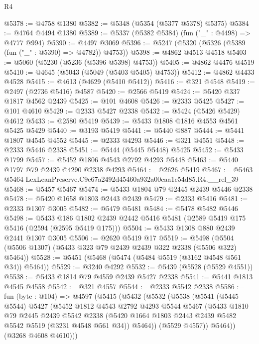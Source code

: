 \begin{lexlean}{R4}
\begin{coremodule}
@5378 := @4758 @1380
@5382 := @5348 (@5354 (@5377 @5378) @5375)
@5384 := @4764 @4494 @1380
@5389 := @5337 (@5382 @5384) (fun ("_" : @4498) => @4777 @994)
@5390 := @4497 @3069
@5396 := @5247 (@5320 (@5326 (@5389 (fun ("_" : @5390) => @4782)) @4753))
@5398 := @4862 @4513 @4518
@5403 := @5060 (@5230 (@5236 (@5396 @5398) @4753))
@5405 := @4862 @4476 @4519
@5410 := @4645 (@5043 (@5049 (@5403 @5405) @4753))
@5412 := @4862 @4433 @4528
@5415 := @4613 (@4629 (@5410 @5412))
@5416 := @321 @4548
@5419 := @2497 (@2736 @5416) @4587
@5420 := @2566 @5419
@5424 := @5420 @337 @1817 @4562 @2439
@5425 := @101 @4608
@5426 := @2333 @5425
@5427 := @101 @4610
@5429 := @2333 @5427 @2338
@5432 := @5424 (@5426 @5429) @4612
@5433 := @2580 @5419
@5439 := @5433 @1808 @1816 @4553 @4561 @5425 @5429
@5440 := @3193 @5419
@5441 := @5440 @887
@5444 := @5441 @1807 @4545 @4552
@5445 := @2333 @4293
@5446 := @321 @4551
@5448 := @2333 @5446 @2338
@5451 := @5444 (@5445 @5448) @5425
@5452 := @5433 @1799
@5457 := @5452 @1806 @4543 @2792 @4293 @5448
@5463 := @5440 @1797 @79 @2439 @4290 @2338 @4293
@5464 := @2626 @5419
@5467 := @5463 @5464 LexLeanPreserve.C9e67a2492d45460a932a00caa1c54d85.R4.__rel_39
@5468 := @5457 @5467
@5474 := @5433 @1804 @79 @2445 @2439 @5446 @2338
@5478 := @5420 @1658 @1803 @2443 @2439
@5479 := @2333 @5416
@5481 := @2333 @1307 @3005
@5482 := @5479 @5481
@5484 := @5478 @5482 @5446
@5498 := @5433
    @186
    @1802
    @2439
    @2442
    @5416
    @5481
    (@2589 @5419 @175 @5416 (@2594 (@2595 @5419 @175)))
@5504 := @5433 @1308 @880 @2439 @2441 @1307 @3005
@5506 := @2620 @5419 @17
@5519 := @5498 (@5504 (@5506 @1307) (@5433 @323 @79 @2439 @2439 @322 @2338 (@5506 @322) @5464))
@5528 := @5451 (@5468 (@5474 (@5484 @5519 (@3162 @4548 @561 @34)) @5464))
@5529 := @3240 @4292
@5532 := @5439 (@5528 (@5529 @4551))
@5538 := @5433 @1814 @79 @4559 @2439 @5427 @2338
@5541 := @5441 @1813 @4545 @4558
@5542 := @321 @4557
@5544 := @2333 @5542 @2338
@5586 := fun (byte : @104) =>
  @4597
    (@5415
      (@5432
        (@5532
          (@5538
            (@5541
              (@5445 @5544)
              @5427
              (@5452
                @1812
                @4543
                @2792
                @4293
                @5544
                @5467
                (@5433
                  @1810
                  @79
                  @2445
                  @2439
                  @5542
                  @2338
                  (@5420 @1664 @1803 @2443 @2439 @5482 @5542 @5519 (@3231 @4548 @561 @34))
                  @5464))
              (@5529 @4557))
            @5464))
        (@3268 @4608 @4610)))

\end{coremodule}
\end{lexlean}
